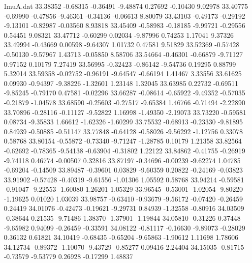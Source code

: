 \begin{filecontents}{ImuA.dat}
  33.38352   -0.68315   -0.36491   -9.48874    0.27692   -0.10430    9.02978
  33.40775   -0.69990   -0.47856   -9.46361   -0.34136   -0.06613    8.80079
  33.43103   -0.49173   -0.29192   -9.13101   -0.82987   -0.03560    8.93818
  33.45409   -0.58983   -0.18185   -9.99721   -0.29556    0.54451    9.08321
  33.47712   -0.60299    0.02034   -9.87996    0.74253    1.17041    9.37326
  33.49994   -0.43669    0.00598   -9.64307    1.01732    0.47581    9.51829
  33.52369   -0.57428   -0.50130   -9.57967    1.43713   -0.05850    8.58706
  33.54664   -0.46301   -0.66879   -9.71127    0.97152    0.10179    7.27419
  33.56995   -0.32423   -0.86142   -9.54736    0.19295    0.88799    5.32014
  33.59358   -0.02752   -0.96191   -9.64547   -0.66194    1.41467    3.33556
  33.61625    0.09930   -0.94397   -9.38226   -1.32601    1.23148    1.32045
  33.63985    0.22732   -0.69511   -9.85245   -0.79170    0.47581   -0.02296
  33.66287   -0.08614   -0.65922   -9.49352   -0.57035   -0.21879   -1.04578
  33.68590   -0.25603   -0.27517   -9.65384    1.46766   -0.71494   -2.22890
  33.70896   -0.28116   -0.11127   -9.52822    1.16998   -1.49350   -2.19073
  33.73220   -0.59581    0.08734   -9.35833    1.66612   -1.62326   -1.60299
  33.75532   -0.68913   -0.23330   -9.81895    0.84939   -0.50885   -0.51147
  33.77848   -0.64128   -0.58026   -9.56292   -1.12756    0.33078    0.58768
  33.80154   -0.55872   -0.73340   -9.71247   -1.28785    0.10179    1.21358
  33.82564   -0.62692   -0.78365   -9.54138   -0.63904   -0.31802    1.22122
  33.84862   -0.41755   -0.26919   -9.74118    0.46774   -0.00507    0.32816
  33.87197   -0.34696   -0.00239   -9.62274    1.04785   -0.69204   -0.14509
  33.89487   -0.39601    0.03829   -9.60359    0.20822   -0.24169   -0.03823
  33.91902   -0.57428   -0.40319   -9.61556   -1.01306    1.05592    0.58768
  33.94214   -0.59581   -0.91047   -9.22553   -1.60080    1.26201    1.05329
  33.96545   -0.53001   -1.02054   -9.80220   -1.19625    0.01020    1.03039
  33.98757   -0.63410   -0.93679   -9.56172   -0.07420   -0.26459    0.24419
  34.01076   -0.42473   -0.19621   -9.29731    0.84939   -1.32558   -0.80916
  34.03509   -0.38644    0.21535   -9.71486    1.38370   -1.37901   -1.19844
  34.05810   -0.31226    0.37448   -9.65982    0.94099   -0.26459   -0.33591
  34.08122   -0.81117   -0.16630   -9.89073   -0.28029    0.36132    0.61821
  34.10419   -0.68435   -0.65204   -9.65863   -1.90612    1.11698    1.78606
  34.12734   -0.89372   -1.10070   -9.43729   -0.85277    0.09416    2.24404
  34.15035   -0.81715   -0.73579   -9.53779    0.26928   -0.17299    1.48837

\end{filecontents}
